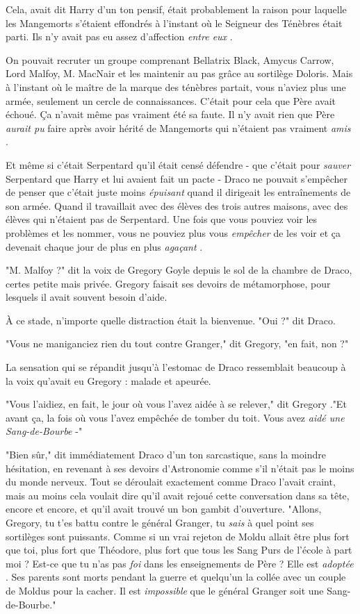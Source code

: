 Cela, avait dit Harry d'un ton pensif, était probablement la raison pour laquelle les Mangemorts s'étaient effondrés à l'instant où le Seigneur des Ténèbres était parti. Ils n'y avait pas eu assez d'affection \emph{entre eux} .

On pouvait recruter un groupe comprenant Bellatrix Black, Amycus Carrow, Lord Malfoy, M. MacNair et les maintenir au pas grâce au sortilège Doloris. Mais à l'instant où le maître de la marque des ténèbres partait, vous n'aviez plus une armée, seulement un cercle de connaissances. C'était pour cela que Père avait échoué. Ça n'avait même pas vraiment été sa faute. Il n'y avait rien que Père \emph{aurait pu}  faire après avoir hérité de Mangemorts qui n'étaient pas vraiment \emph{amis} .

Et même si c'était Serpentard qu'il était censé défendre - que c'était pour \emph{sauver } Serpentard que Harry et lui avaient fait un pacte - Draco ne pouvait s'empêcher de penser que c'était juste moins \emph{épuisant}  quand il dirigeait les entraînements de son armée. Quand il travaillait avec des élèves des trois autres maisons, avec des élèves qui n'étaient pas de Serpentard. Une fois que vous pouviez voir les problèmes et les nommer, vous ne pouviez plus vous \emph{empêcher}  de les voir et ça devenait chaque jour de plus en plus \emph{agaçant} .

"M. Malfoy ?" dit la voix de Gregory Goyle depuis le sol de la chambre de Draco, certes petite mais privée. Gregory faisait ses devoirs de métamorphose, pour lesquels il avait souvent besoin d'aide.

À ce stade, n'importe quelle distraction était la bienvenue. "Oui ?" dit Draco.

"Vous ne maniganciez rien du tout contre Granger," dit Gregory, "en fait, non ?"

La sensation qui se répandit jusqu'à l'estomac de Draco ressemblait beaucoup à la voix qu'avait eu Gregory : malade et apeurée.

"Vous l'aidiez, en fait, le jour où vous l'avez aidée à se relever," dit Gregory ."Et avant ça, la fois où vous l'avez empêchée de tomber du toit. Vous avez \emph{aidé une Sang-de-Bourbe}  -"

"Bien sûr," dit immédiatement Draco d'un ton sarcastique, sans la moindre hésitation, en revenant à ses devoirs d'Astronomie comme s'il n'était pas le moins du monde nerveux. Tout se déroulait exactement comme Draco l'avait craint, mais au moins cela voulait dire qu'il avait rejoué cette conversation dans sa tête, encore et encore, et qu'il avait trouvé un bon gambit d'ouverture. "Allons, Gregory, tu t'es battu contre le général Granger, tu \emph{sais}  à quel point ses sortilèges sont puissants. Comme si un vrai rejeton de Moldu allait être plus fort que toi, plus fort que Théodore, plus fort que tous les Sang Purs de l'école à part moi ? Est-ce que tu n'as pas \emph{foi}  dans les enseignements de Père ? Elle est \emph{adoptée} . Ses parents sont morts pendant la guerre et quelqu'un la collée avec un couple de Moldus pour la cacher. Il est \emph{impossible}  que le général Granger soit une Sang-de-Bourbe."

